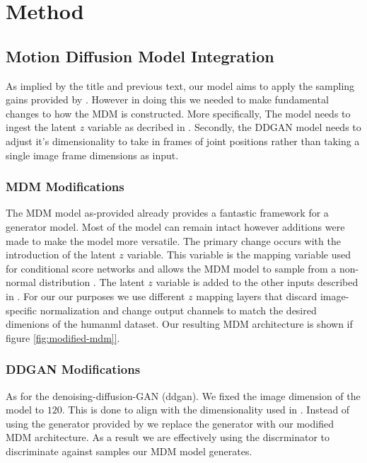 \documentclass[10pt,twocolumn,letterpaper]{article}
\begin{document}
\section{Method}
\label{sec:method}

\subsection{Motion Diffusion Model Integration}
As implied by the title and previous text, our model aims to apply the sampling gains provided by \cite{Xiao22}. However in doing this we needed to make fundamental changes to how the MDM is constructed. More specifically, The model needs to ingest the latent $z$ variable as decribed in \cite{Xiao22}. Secondly, the DDGAN model needs to adjust it's dimensionality to take in frames of joint positions rather than taking a single image frame dimensions as input.

\subsubsection{MDM Modifications}

The MDM model as-provided already provides a fantastic framework for a generator model. Most of the model can remain intact however additions were made to make the model more versatile. The primary change occurs with the introduction of the latent $z$ variable. This variable is the mapping variable used for conditional score networks and allows the MDM model to sample from a non-normal distribution \cite{xiao2022tackling}. The latent $z$ variable is added to the other inputs described in \cite{Tevet23}. For our our purposes we use different $z$ mapping layers that discard image-specific normalization and change output channels to match the desired dimenions of the humanml dataset.  Our resulting MDM architecture is shown if figure \ref{fig:modified-mdm]}. \par

\subsubsection{DDGAN Modifications}\label{sec:ddgan-mod}

As for the denoising-diffusion-GAN (ddgan). We fixed the image dimension of the model to $120$. This is done to align with the dimensionality used in \cite{Guo_2022_CVPR}. Instead of using the generator provided by \cite{Xiao22} we replace the generator with our modified MDM architecture. As a result we are effectively using the discrminator to discriminate against samples our MDM model generates. \par 
\end{document}
